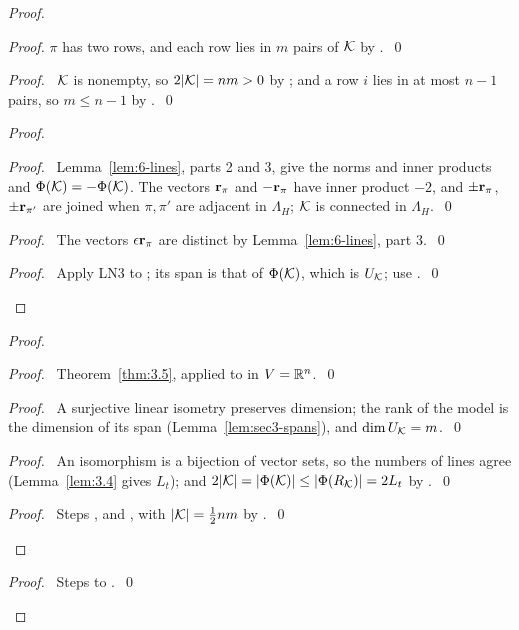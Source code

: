 \begin{proof}
\begin{proof}
  $\pi$ has two rows, and each row lies in $m$ pairs of ${\mathcal K}$ by .~\qed
 \end{proof}
 \begin{proof}\pf\ ${\mathcal K}$ is nonempty, so $2|{\mathcal K}|=nm>0$ by ; and a row $i$ lies in
  at most $n-1$ pairs, so $m\leq n-1$ by .~\qed\end{proof}
 \begin{proof}
  \begin{proof}\pf\ Lemma~\ref{lem:6-lines}, parts 2 and 3, give the norms and inner products
   and $\Phi({\mathcal K})=-\Phi({\mathcal K})$. The vectors ${\mathbf r}_\pi$ and $-{\mathbf r}_\pi$ have inner product $-2$, and
   $\pm{\mathbf r}_\pi$, $\pm{\mathbf r}_{\pi'}$ are joined when $\pi,\pi'$ are adjacent in $\Lambda_H$; ${\mathcal K}$ is
   connected in $\Lambda_H$.~\qed\end{proof}
  \begin{proof}\pf\ The vectors $\epsilon{\mathbf r}_\pi$ are distinct by Lemma~\ref{lem:6-lines},
   part 3.~\qed\end{proof}
  \qedstep
  \begin{proof}\pf\ Apply LN3 to ; its span is that of $\Phi({\mathcal K})$, which is
   $U_{\mathcal K}$; use .~\qed\end{proof}
 \end{proof}
 \begin{proof}
  \begin{proof}\pf\ Theorem~\ref{thm:3.5}, applied to  in $V={\mathbb R}^n$.~\qed
  \end{proof}
  \begin{proof}\pf\ A surjective linear isometry preserves dimension; the rank of the model is
   the dimension of its span (Lemma~\ref{lem:sec3-spans}), and $\dim U_{\mathcal K}=m$.~\qed\end{proof}
  \begin{proof}\pf\ An isomorphism is a bijection of vector sets, so the numbers of lines agree
   (Lemma~\ref{lem:3.4} gives $L_t$); and $2|{\mathcal K}|=|\Phi({\mathcal K})|\leq|\Phi(R_{\mathcal K})|=2L_t$ by
   .~\qed\end{proof}
  \qedstep
  \begin{proof}\pf\ Steps ,  and , with
   $|{\mathcal K}|=\frac12nm$ by .~\qed\end{proof}
 \end{proof}
 \qedstep
 \begin{proof}\pf\ Steps  to .~\qed\end{proof}
\end{proof}

